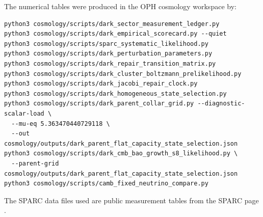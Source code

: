 \documentclass[11pt]{article}
\begin{document}
The numerical tables were produced in the OPH cosmology workspace by:
\begin{verbatim}
python3 cosmology/scripts/dark_sector_measurement_ledger.py
python3 cosmology/scripts/dark_empirical_scorecard.py --quiet
python3 cosmology/scripts/sparc_systematic_likelihood.py
python3 cosmology/scripts/dark_perturbation_parameters.py
python3 cosmology/scripts/dark_repair_transition_matrix.py
python3 cosmology/scripts/dark_cluster_boltzmann_prelikelihood.py
python3 cosmology/scripts/dark_jacobi_repair_clock.py
python3 cosmology/scripts/dark_homogeneous_state_selection.py
python3 cosmology/scripts/dark_parent_collar_grid.py --diagnostic-scalar-load \
  --mu-eq 5.363470440729118 \
  --out cosmology/outputs/dark_parent_flat_capacity_state_selection.json
python3 cosmology/scripts/dark_cmb_bao_growth_s8_likelihood.py \
  --parent-grid cosmology/outputs/dark_parent_flat_capacity_state_selection.json
python3 cosmology/scripts/camb_fixed_neutrino_compare.py
\end{verbatim}
The SPARC data files used are public measurement tables from the SPARC page
\cite{sparcpage}.
\end{document}
